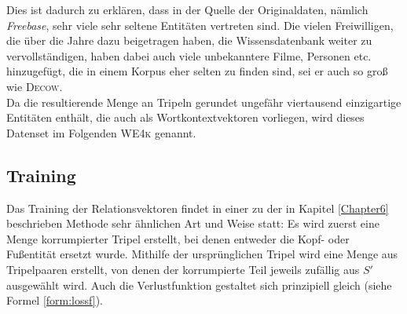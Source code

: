 \begin{table}[h]
  \centering
  \begin{changemargin}{0cm}{0cm}
\end{changemargin}
  \caption[Daten des neuen Relationsdatensets im Vergleich zu \textsc{FB15k} und \textsc{GER14k}]{Daten des neuen Sets \textsc{WE4k} im Vergleich mit
  \textsc{FB15k} und \textsc{GER14k}. Aufgelistet ist die Anzahl der Tripel (Datensätze), Entitäts- und Relationstypen und die Veränderung
  der Anzahlen in Prozent im Vergleich zu \textsc{FB15k} in Klammern.\label{fig:we4k}}
\end{table}

Dies ist dadurch zu erklären, dass in der Quelle der Originaldaten, nämlich \emph{Freebase},
sehr viele sehr seltene Entitäten vertreten sind. Die vielen Freiwilligen, die über die
Jahre dazu beigetragen haben, die Wissensdatenbank weiter zu vervollständigen, haben dabei auch
viele unbekanntere Filme, Personen etc. hinzugefügt, die in einem Korpus eher selten zu finden sind, sei er auch
so groß wie \textsc{Decow}.\\

Da die resultierende Menge an Tripeln gerundet ungefähr viertausend einzigartige Entitäten enthält, die auch als
Wortkontextvektoren vorliegen, wird dieses Datenset im Folgenden \textsc{WE4k} genannt.

\subsection{Training}

Das Training der Relationsvektoren findet in einer zu der in Kapitel \ref{Chapter6} beschrieben Methode sehr
ähnlichen Art und Weise statt: Es wird zuerst eine Menge korrumpierter Tripel erstellt, bei denen entweder
die Kopf- oder Fußentität ersetzt wurde.
Mithilfe der ursprünglichen Tripel wird eine Menge aus Tripelpaaren erstellt, von denen der korrumpierte Teil jeweils
zufällig aus $S'$ ausgewählt wird. Auch die Verlustfunktion gestaltet sich prinzipiell gleich (siehe Formel \ref{form:lossf}).\\

